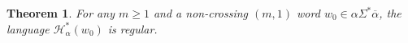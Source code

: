 \documentclass{article}
\theoremstyle{plain}
\newtheorem{theorem}{Theorem}
\theoremstyle{remark}
\newcommand{\RHC}{\ensuremath{\mathcal{R\hspace*{-0.5mm}H}}}
\newcommand{\HC}{\ensuremath{\mathcal{H}}}
\newcommand{\ind}{\ensuremath{\mathrm{ind}}}
\newcommand{\maxind}{\ensuremath{\mathrm{maxind}}}
\begin{document}
\begin{comment}
\begin{theorem}\label{thm:m1_nonx_representation}
	For any $m \ge 1$ and a non-crossing $(m, 1)$ word $w_0 \in \alpha \Sigma^* \overline{\alpha}$, $\HC_\alpha^*(w_0) = L(w_0)$. 
\end{theorem}
\begin{proof}
	Let us prove $\HC_\alpha^*(w_0) \supseteq L(w_0)$ first. 
	By definition, any word $w$ in $L(w_0)$ can be factorized as $w = x_s \cdots x_1 w_0 \overline{y_1} \cdots \overline{y_t}$. 
	Compare the leftmost factor $x_s$ and the complement of the rightmost factor $\overline{y_t}$ with respect to their index. 
	Assume that $\ind(x_s) \le \ind(y_t)$. 
	Then $w \ge_s \bar{\alpha} \overline{y_t} \ge_s \bar{\alpha} \overline{x_s}$. 
	Hence, one-step left hairpin completion can derive $w$ from the word $x_{s-1} \cdots x_1 w_0 \overline{y_1} \cdots \overline{y_t}$. 
	In the case when $\ind(x_1) > \ind(y_t)$, the same argument implies that $w \in \RHC_\alpha(x_s \cdots x_1 w_0 \overline{y_1} \cdots \overline{y_{t-1}})$. 
	Due to $\maxind(x_1, \ldots, x_s) \le \maxind(y_1, \ldots, y_t)$, the repetition of this process eventually reduces $w_0$ into a word $w_0 \overline{y_1} \cdots \overline{y_j}$ for some $1 \le j \le t$. 
	Since $(\overline{y_1}, \ldots, \overline{y_t}) \in F_{\rm rext}(w_0)$, iterated right hairpin completion can produce $w_0 \overline{y_1} \cdots \overline{y_j}$ from $w_0$. 
	Thus, $w \in \HC_\alpha^*(w_0)$. 

	Next we prove the converse inclusion on the length of derivation by hairpin completion. 
	Clearly $w_0 \in L(w_0)$. 
	Let us assume that a word in $\HC_\alpha^*(w_0)$ can be written as $x_s \cdots x_1 w_0 y_1 \cdots y_t$ with $\maxind(x_1, \ldots, x_s) \le \maxind(y_1, \ldots, y_t)$. 
	If left hairpin completion extends this word to the left by $x$, then $\bar{\alpha} \overline{y_1} \cdots \overline{y_t} \ge_s \bar{\alpha}\bar{x}$ and this means $x \in \{u_1, \ldots, u_{\maxind(y_1, \ldots, y_t)}\}^+$ (see Lemma~\ref{lem:aprefix_prefix}). 
	Thus, there exist $x_{s'}, \ldots, x_{s+1} \in \{u_1, \ldots, u_{\maxind(y_1, \ldots, y_t)}\}$ such that $x = x_{s'} \cdots x_{s+1}$ and $\maxind(x_{s'}, \ldots, x_{s+1}, x_s, \ldots, x_1) \le \maxind(y_1, \ldots, y_t)$. 
	It it trivial that this inequality remains valid in the right hairpin completion. 
\end{proof}
\end{comment}

\begin{theorem}\label{thm:m1nonx_regular}
	For any $m \ge 1$ and a non-crossing $(m, 1)$ word $w_0 \in \alpha \Sigma^* \overline{\alpha}$, the language $\HC_\alpha^*(w_0)$ is regular. 
\end{theorem}
\end{document}
